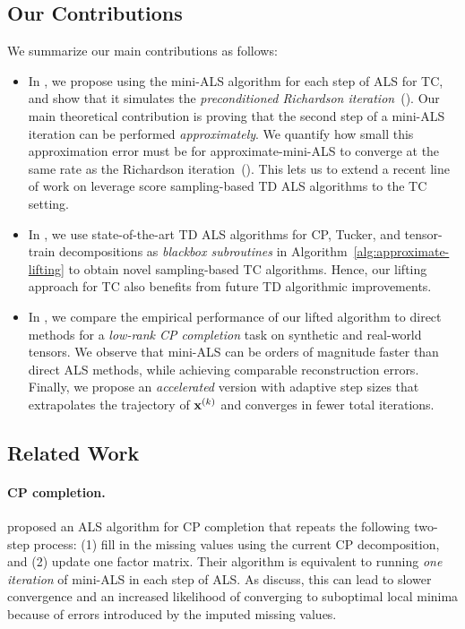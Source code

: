 \subsection{Our Contributions}
We summarize our main contributions as follows:
\begin{itemize}
\item In , we propose using the mini-ALS algorithm
for each step of ALS for TC, and show that it simulates the \emph{preconditioned Richardson iteration}~().
Our main theoretical contribution is proving that the second step of a mini-ALS iteration can be performed \emph{approximately}.
We quantify how small this approximation error must be for approximate-mini-ALS to converge
at the same rate as the Richardson iteration~().
This lets us to extend a recent line of work
on leverage score sampling-based TD ALS algorithms to the TC setting.

\item In ,
we use state-of-the-art TD ALS algorithms
for CP,
Tucker, 
and tensor-train decompositions 
as \emph{blackbox subroutines} in Algorithm~\ref{alg:approximate-lifting}
to obtain novel sampling-based TC algorithms.
Hence, our lifting approach for TC also benefits from future TD algorithmic improvements.

\item In , 
we compare the empirical performance of
our lifted algorithm to direct methods for a \emph{low-rank CP completion} task on synthetic and real-world tensors.
We observe that mini-ALS can be orders of magnitude faster than direct ALS methods,
while achieving comparable reconstruction errors.
Finally, we propose an \emph{accelerated} version with adaptive step sizes that extrapolates the trajectory of $\mathbf{x}^{(k)}$ and converges in fewer total iterations.

\end{itemize}

\subsection{Related Work}
\label{sec:related-work}

\paragraph{CP completion.}
\citet{tomasi2005parafac} proposed an ALS algorithm for CP completion that repeats the following two-step process:
(1) fill in the missing values using the current CP decomposition, and 
(2) update one factor matrix.
Their algorithm is equivalent to running \emph{one iteration} of mini-ALS in each step of ALS.
As \citet{tomasi2005parafac} discuss, this can lead to slower convergence and an increased likelihood of converging to suboptimal local minima because of errors introduced by the imputed missing values.

